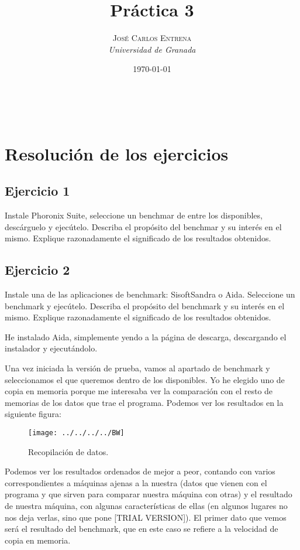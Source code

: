 \documentclass[a4paper, 11pt]{article} %
\title{\textbf{Práctica 3}\\ %
} %
\author{\textsc{José Carlos Entrena} %
\\{\textit{Universidad de Granada}}} %
\date{\today} %
\makeatletter
\renewcommand{\maketitle}{ %
\begin{flushright} %
{\LARGE\@title} %

\vspace{60pt} %

{\large\@author} %
\\\@date %

\vspace{40pt} %
\end{flushright}
}
\makeatother
\begin{document}
\maketitle %

{\parskip=2pt
  \tableofcontents
}   %

\pagebreak %

\section{Resolución de los ejercicios}

\subsection{Ejercicio 1}
Instale Phoronix Suite, seleccione un benchmar de entre los disponibles, descárguelo y ejecútelo. Describa el propósito del benchmar y su interés en el mismo. Explique razonadamente el significado de los resultados obtenidos. 

\subsection{Ejercicio 2}
Instale una de las aplicaciones de benchmark: SisoftSandra o Aida. Seleccione un benchmark y ejecútelo. Describa el propósito del benchmark y su interés en el mismo. Explique razonadamente el significado de los resultados obtenidos. 

He instalado Aida, simplemente yendo a la página de descarga, descargando el instalador y ejecutándolo. 
 
Una vez iniciada la versión de prueba, vamos al apartado de benchmark y seleccionamos el que queremos dentro de los disponibles. Yo he elegido uno de copia en memoria porque me interesaba ver la comparación con el resto de memorias de los datos que trae el programa. Podemos ver los resultados en la siguiente figura: 

\begin{figure}[htpb]
\centering
\texttt{[image: ../../../../BW]}
\caption{Recopilación de datos.}
\end{figure}

Podemos ver los resultados ordenados de mejor a peor, contando con varios correspondientes a máquinas ajenas a la nuestra (datos que vienen con el programa y que sirven para comparar nuestra máquina con otras) y el resultado de nuestra máquina, con algunas características de ellas (en algunos lugares no nos deja verlas, sino que pone [TRIAL VERSION]). El primer dato que vemos será el resultado del benchmark, que en este caso se refiere a la velocidad de copia en memoria. 
\end{document}
